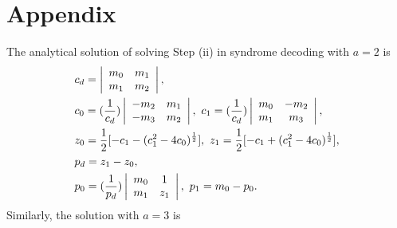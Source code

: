 \documentclass[journal,onecolumn,11pt]{IEEEtran}
\begin{document}
\section{Appendix}\label{Sec: Appendix}
\footnotesize
The analytical solution of solving Step (ii) in syndrome decoding with $a=2$ is
\begin{equation}
\begin{aligned}
    &c_{d}=
    \left|
          \begin{array}{cc}
            m_{0} & m_{1} \\
            m_{1} & m_{2} \\
          \end{array}
        \right|,\\
    \displaystyle &c_{0}= (\frac{1}{c_{d}})\left|
          \begin{array}{cc}
            -m_{2} & m_{1} \\
            -m_{3} & m_{2} \\
          \end{array}
        \right|,\
    \displaystyle c_{1}= (\frac{1}{c_{d}})\left|
          \begin{array}{cc}
            m_{0} & -m_{2} \\
            m_{1} & m_{3} \\
          \end{array}
    \right|,\\
    \displaystyle &z_{0}=\frac{1}{2}[-c_{1}-(c_{1}^{2}-4c_{0})^{\frac{1}{2}}], \
    \displaystyle z_{1}=\frac{1}{2}[-c_{1}+(c_{1}^{2}-4c_{0})^{\frac{1}{2}}],\\
    &p_{d}=z_{1}-z_{0},\\
    \displaystyle &p_{0}= (\frac{1}{p_{d}})\left|
          \begin{array}{cc}
            m_{0} & 1 \\
            m_{1} & z_{1} \\
          \end{array}
    \right|,\
    p_{1}= m_{0}-p_{0}.
\end{aligned}
\label{eq:MPT analytic solutions}
\end{equation}
Similarly, the solution with $a=3$ is
\end{document}
